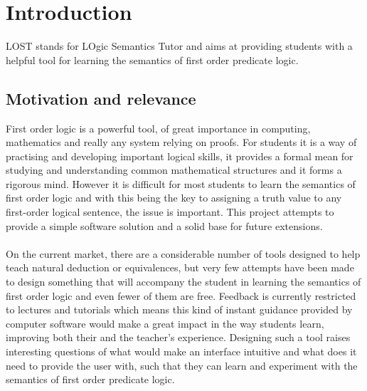 \documentclass{report}
\begin{document}

\chapter{Introduction}

LOST stands for LOgic Semantics Tutor and aims at providing students with a helpful tool for learning the semantics of first order predicate logic.

\section{Motivation and relevance}
First order logic is a powerful tool, of great importance in computing, mathematics and really any system relying on proofs. For students it is a way of practising and developing important logical skills, it provides a formal mean for studying and understanding common mathematical structures and it forms a rigorous mind. However it is difficult for most students to learn the semantics of first order logic and with this being the key to assigning a truth value to any first-order logical sentence, the issue is important. This project attempts to provide a simple software solution and a solid base for future extensions. \\ \\
On the current market, there are a considerable number of tools designed to help teach natural deduction or equivalences, but very few attempts have been made to design something that will accompany the student in learning the semantics of first order logic and even fewer of them are free. Feedback is currently restricted to lectures and tutorials which means this kind of instant guidance provided by computer software would make a great impact in the way students learn, improving both their and the teacher's experience. Designing such a tool raises interesting questions of what would make an interface intuitive and what does it need to provide the user with, such that they can learn and experiment with the semantics of first order predicate logic.
\end{document}
